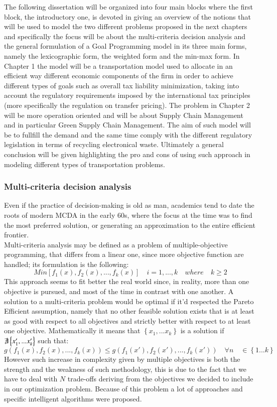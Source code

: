 \begin{doublespace}
The following dissertation will be organized into four main blocks where the first block, the introductory one, is devoted in giving an overview of the notions that will be used to model the two different problems proposed in the next chapters and specifically the focus will be about the multi-criteria decision analysis and the general formulation of a Goal Programming model in its three main forms, namely the lexicographic form, the weighted form and the min-max form. In Chapter 1 the model will be a transportation model used to allocate in an efficient way different economic components of the firm in order to achieve different types of goals such as overall tax liability minimization, taking into account the regulatory requirements imposed by the international tax principles (more specifically the regulation on transfer pricing). The problem in Chapter 2 will be more operation oriented and will be about Supply Chain Management and in particular Green Supply Chain Management. The aim of such model will be to fullfill the demand and the same time comply with the different regulatory legislation in terms of recycling electronical waste. Ultimately a general conclusion will be given highlighting the pro and cons of using such approach in modeling different types of transportation problems.

\subsubsection{Multi-criteria decision analysis}
Even if the practice of decision-making is old as man, academics tend to date the roots of modern MCDA in the early 60s, where the focus at the time was to find the most preferred solution, or generating an approximation to the entire efficient frontier\cite{Greco2016}.
\\
Multi-criteria analysis may be defined as a problem of multiple-objective programming, that differs from a linear one,
since more objective function are handled; its formulation is the following:
	$$
	Min[f_1(x),f_2(x),...,f_k(x)] \quad i=1,...,k \quad where \quad k\geq2
	$$
This approach seems to fit better the real world since, in reality, more than one objective is pursued, and most of the time in contrast with one another.
A solution to a multi-criteria problem would be optimal if it'd respected the Pareto Efficient assumption, namely that no other feasible solution exists that is at least as good with respect to all objectives and strictly better with respect to at least one objective. Mathematically it means that $\left\{x_1,...x_k\right\}$ is a solution if $\not\exists \left\{x'_1,...x'_k\right\}$
such that:
	\[
	g(f_1(x),f_2(x),...,f_k(x)) \leq g(f_1(x'),f_2(x'),...,f_k(x')) \quad \forall n \quad \in  \left\{1...k\right\}
	\]
However such increase in complexity given by multiple objectives is both the strength and the weakness of such methodology, this is due to the fact that we have to deal with $N$ trade-offs deriving from the objectives we decided to include in our optimization problem. Because of this problem a lot of approaches and specific intelligent algorithms were proposed\cite{Cui2017}.


\end{doublespace}
